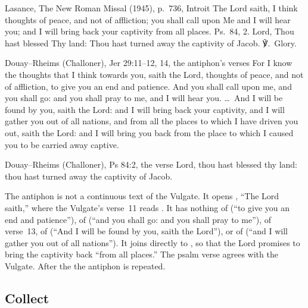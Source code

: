 \begin{englishwitness}{Lasance, The New Roman Missal (1945), p.~736, Introit}
The Lord saith, I think thoughts of peace, and not of affliction; you shall
call upon Me and I will hear you; and I will bring back your captivity from
all places. Ps.~84, 2. Lord, Thou hast blessed Thy land: Thou hast turned away
the captivity of Jacob. ℣.~Glory.
\end{englishwitness}

\begin{englishwitness}{Douay--Rheims (Challoner), Jer 29:11--12, 14, the antiphon's verses}
For I know the thoughts that I think towards you, saith the Lord, thoughts of
peace, and not of affliction, to give you an end and patience. And you shall
call upon me, and you shall go: and you shall pray to me, and I will hear you.
\dots\ And I will be found by you, saith the Lord: and I will bring back your
captivity, and I will gather you out of all nations, and from all the places
to which I have driven you out, saith the Lord: and I will bring you back from
the place to which I caused you to be carried away captive.
\end{englishwitness}

\begin{englishwitness}{Douay--Rheims (Challoner), Ps 84:2, the verse}
Lord, thou hast blessed thy land: thou hast turned away the captivity of
Jacob.
\end{englishwitness}

\noindent The antiphon is not a continuous text of the Vulgate. It opens
, ``The Lord saith,'' where the Vulgate's verse~11 reads
. It
has nothing of  (``to give you an end
and patience''), of  (``and you shall go: and
you shall pray to me''), of verse~13, of  (``And I will be found by you, saith the Lord''), or of  (``and I will gather you out of all
nations''). It joins  directly to
, so that the Lord promises to bring the captivity
back ``from all places.'' The psalm verse agrees with the Vulgate. After the
 the antiphon is repeated.

\subsection{Collect}
\label{proper-collect}

